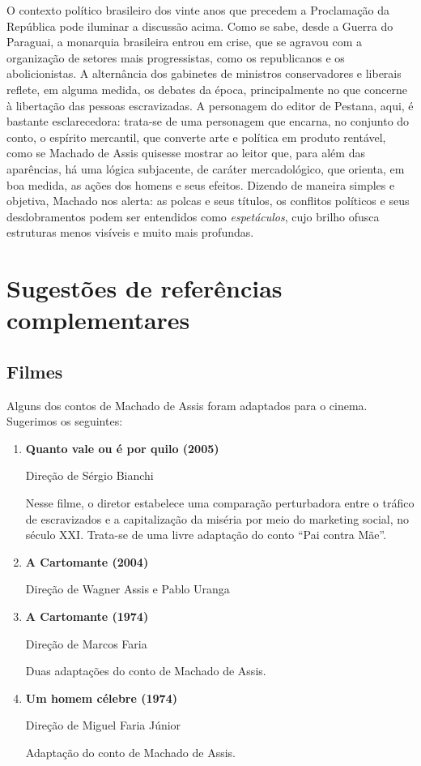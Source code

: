 \documentclass[12pt]{extarticle}
\begin{document}
O contexto político brasileiro dos vinte anos que precedem a Proclamação
da República pode iluminar a discussão acima. Como se sabe, desde a
Guerra do Paraguai, a monarquia brasileira entrou em crise, que se
agravou com a organização de setores mais progressistas, como os
republicanos e os abolicionistas. A alternância dos gabinetes de
ministros conservadores e liberais reflete, em alguma medida, os debates
da época, principalmente no que concerne à libertação das pessoas
escravizadas. A personagem do editor de Pestana, aqui, é bastante
esclarecedora: trata-se de uma personagem que encarna, no conjunto do
conto, o espírito mercantil, que converte arte e política em produto
rentável, como se Machado de Assis quisesse mostrar ao leitor que, para
além das aparências, há uma lógica subjacente, de caráter mercadológico,
que orienta, em boa medida, as ações dos homens e seus efeitos. Dizendo
de maneira simples e objetiva, Machado nos alerta: as polcas e seus
títulos, os conflitos políticos e seus desdobramentos podem ser
entendidos como \emph{espetáculos}, cujo brilho ofusca estruturas menos
visíveis e muito mais profundas.

\section{Sugestões de referências complementares}

\subsection{Filmes}

Alguns dos contos de Machado de Assis foram adaptados para o cinema.
Sugerimos os seguintes:

\begin{enumerate}
\item\textbf{Quanto vale ou é por quilo (2005)}

Direção de Sérgio Bianchi

Nesse filme, o diretor estabelece uma comparação perturbadora entre o
tráfico de escravizados e a capitalização da miséria por meio do
marketing social, no século XXI. Trata-se de uma livre adaptação do
conto ``Pai contra Mãe''.

\item\textbf{A Cartomante (2004)}

Direção de Wagner Assis e Pablo Uranga

\item\textbf{A Cartomante (1974)}

Direção de Marcos Faria

Duas adaptações do conto de Machado de Assis.

\item\textbf{Um homem célebre (1974)}

Direção de Miguel Faria Júnior

Adaptação do conto de Machado de Assis.
\end{enumerate}
\end{document}
